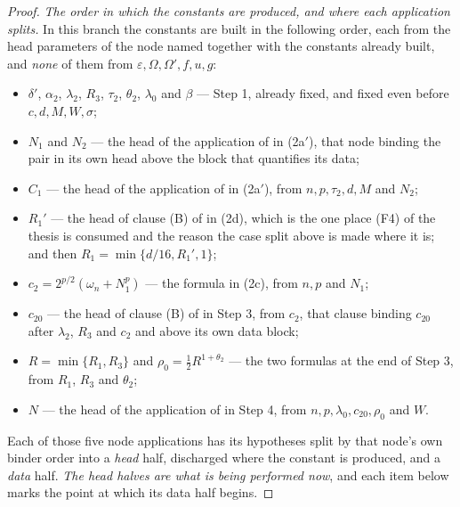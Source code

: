 \begin{proof}
\emph{The order in which the constants are produced, and where each application
splits.}  In this branch the constants are built in the following order, each
from the head parameters of the node named together with the constants already
built, and \emph{none} of them from $\varepsilon,\Omega,\Omega',f,u,g$:
\begin{itemize}
\item $\delta'$, $\alpha_2$, $\lambda_2$, $R_3$, $\tau_2$, $\theta_2$,
  $\lambda_0$ and $\beta$ --- Step 1, already fixed, and fixed even before
  $c,d,M,W,\sigma$;
\item $N_1$ and $N_2$ --- the head of the application of
   in (2a$'$), that node binding the pair in
  its own head above the block that quantifies its data;
\item $C_1$ --- the head of the application of
   in (2a$'$), from $n,p,\tau_2,d,M$ and
  $N_2$;
\item $R_1'$ --- the head of clause (B) of
   in (2d), which is the one place
  (F4) of the thesis is consumed and the reason the case split above is made where it
  is; and then $R_1=\min\{d/16,R_1',1\}$;
\item $c_2=2^{p/2}(\omega_n+N_1^p)$ --- the formula in (2c), from $n,p$ and
  $N_1$;
\item $c_{20}$ --- the head of clause (B) of
   in Step 3, from $c_2$, that clause
  binding $c_{20}$ after $\lambda_2$, $R_3$ and $c_2$ and above its own data
  block;
\item $R=\min\{R_1,R_3\}$ and $\rho_0=\tfrac12R^{1+\theta_2}$ --- the two
  formulas at the end of Step 3, from $R_1$, $R_3$ and $\theta_2$;
\item $N$ --- the head of the application of 
  in Step 4, from $n,p,\lambda_0,c_{20},\rho_0$ and $W$.
\end{itemize}
Each of those five node applications has its hypotheses split by that node's own
binder order into a \emph{head} half, discharged where the constant is produced,
and a \emph{data} half.  \emph{The head halves are what is being performed
now}, and each item below marks the point at which its data half begins.


\end{proof}
